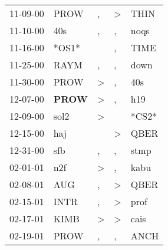 \begin{supertabular}{p{0.07\textwidth}p{0.06\textwidth}p{0.02\textwidth}p{0.02\textwidth}p{0.06\textwidth}}
          11-09-00\textsuperscript{} &           PROW\textsuperscript{} &                , &     \textgreater &           THIN\textsuperscript{} \\
          11-10-00\textsuperscript{} &            40s\textsuperscript{} &                , &                , &           noqs\textsuperscript{} \\
          11-16-00\textsuperscript{} &                            *OS1* &                  &                , &           TIME\textsuperscript{} \\
          11-25-00\textsuperscript{} &           RAYM\textsuperscript{} &                , &                , &           down\textsuperscript{} \\
          11-30-00\textsuperscript{} &           PROW\textsuperscript{} &     \textgreater &                , &            40s\textsuperscript{} \\
          12-07-00\textsuperscript{} &  \textbf{PROW\textsuperscript{}} &     \textgreater &                , &            h19\textsuperscript{} \\
          12-09-00\textsuperscript{} &           sol2\textsuperscript{} &     \textgreater &                  &                            *CS2* \\
          12-15-00\textsuperscript{} &            haj\textsuperscript{} &                  &     \textgreater &           QBER\textsuperscript{} \\
          12-31-00\textsuperscript{} &            sfb\textsuperscript{} &                , &                , &           stmp\textsuperscript{} \\
          02-01-01\textsuperscript{} &            n2f\textsuperscript{} &     \textgreater &                , &           kabu\textsuperscript{} \\
          02-08-01\textsuperscript{} &            AUG\textsuperscript{} &                , &     \textgreater &           QBER\textsuperscript{} \\
          02-15-01\textsuperscript{} &           INTR\textsuperscript{} &                , &     \textgreater &           prof\textsuperscript{} \\
          02-17-01\textsuperscript{} &           KIMB\textsuperscript{} &     \textgreater &     \textgreater &           cais\textsuperscript{} \\
          02-19-01\textsuperscript{} &           PROW\textsuperscript{} &                , &                , &           ANCH\textsuperscript{} \\

\end{supertabular}
